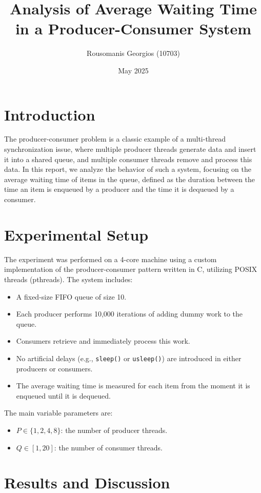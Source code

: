 \documentclass[11pt]{article}
\title{Analysis of Average Waiting Time in a Producer-Consumer System}
\author{Rousomanis Georgios (10703)}
\date{May 2025}
\begin{document}
\maketitle

\section{Introduction}

The producer-consumer problem is a classic example of a multi-thread synchronization issue, where multiple producer threads generate data and insert it into a shared queue, and multiple consumer threads remove and process this data. In this report, we analyze the behavior of such a system, focusing on the average waiting time of items in the queue, defined as the duration between the time an item is enqueued by a producer and the time it is dequeued by a consumer.

\section{Experimental Setup}

The experiment was performed on a 4-core machine using a custom implementation of the producer-consumer pattern written in C, utilizing POSIX threads (pthreads). The system includes:
\begin{itemize}
    \item A fixed-size FIFO queue of size 10.
    \item Each producer performs 10,000 iterations of adding dummy work to the queue.
    \item Consumers retrieve and immediately process this work.
    \item No artificial delays (e.g., \texttt{sleep()} or \texttt{usleep()}) are introduced in either producers or consumers.
    \item The average waiting time is measured for each item from the moment it is enqueued until it is dequeued.
\end{itemize}

The main variable parameters are:
\begin{itemize}
    \item \( P \in \{1, 2, 4, 8\} \): the number of producer threads.
    \item \( Q \in [1, 20] \): the number of consumer threads.
\end{itemize}

\section{Results and Discussion}
\end{document}
